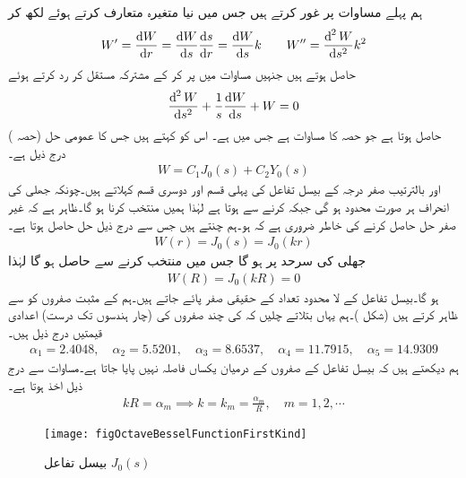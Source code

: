 \quad ہم پہلے مساوات  پر غور کرتے ہیں جس میں نیا متغیرہ  متعارف کرتے ہوئے
  لکھ کر
\begin{align*}
W'=\frac{\dif W}{\dif r}=\frac{\dif W}{\dif s}\frac{\dif s}{\dif r}=\frac{\dif W}{\dif s}k\quad \text{}\quad W''=\frac{\dif^{\,2}W}{\dif s^2}k^2
\end{align*}
حاصل ہوتے ہیں جنہیں مساوات  میں پر کر کے مشترکہ مستقل  کر رد کرتے ہوئے
\begin{align}
\frac{\dif^{\,2}W}{\dif s^2}+\frac{1}{s}\frac{\dif W}{\dif s}+W=0
\end{align}
حاصل ہوتا ہے جو حصہ  کا مساوات  ہے جس  میں  ہے۔ اس کو   کہتے ہیں جس کا عمومی حل (حصہ ) درج ذیل ہے۔
\begin{align*}
W=C_1J_0(s)+C_2Y_0(s)
\end{align*}
 اور  بالترتیب صفر درجہ کے بیسل تفاعل کی پہلی قسم اور دوسری قسم کہلاتے ہیں۔چونکہ جھلی کی انحراف ہر صورت محدود ہو گی جبکہ  کرنے سے  ہوتا ہے لہٰذا ہمیں  منتخب کرنا ہو گا۔ظاہر ہے کہ غیر صفر حل حاصل کرنے  کی خاطر ضروری ہے کہ  ہو۔ہم  چنتے ہیں جس سے درج ذیل حل حاصل ہوتا ہے۔
\begin{align}\label{مساوات_جزوی_دائری_حل_الف}
W(r)=J_0(s)=J_0(kr)
\end{align}
جھلی کی سرحد  پر  ہو گا جس میں  منتخب کرنے سے   حاصل ہو گا لہٰذا 
\begin{align*}
W(R)=J_0(kR)=0
\end{align*}
ہو گا۔بیسل تفاعل  کے لا محدود تعداد کے حقیقی صفر پائے جاتے ہیں۔ہم  کے مثبت صفروں کو  سے ظاہر کرتے ہیں (شکل )۔ہم یہاں بتلاتے چلیں کہ  کی چند صفروں کی (چار ہندسوں تک درست) اعدادی قیمتیں درج ذیل ہیں۔
\begin{align*}
\alpha_1=2.4048,\quad \alpha_2=5.5201,\quad \alpha_3=8.6537,\quad \alpha_4=11.7915,\quad \alpha_5=14.9309
\end{align*}
ہم دیکھتے ہیں کہ بیسل تفاعل کے صفروں کے درمیان یکساں فاصلہ نہیں پایا جاتا ہے۔مساوات  سے درج ذیل اخذ ہوتا ہے۔
\begin{align}\label{مساوات_جزوی_دائری_حل_ب}
kR=\alpha_m \implies k=k_m=\frac{\alpha_m}{R}, \quad m=1,2,\cdots
\end{align}
%
\begin{figure}
\centering
\texttt{[image: figOctaveBesselFunctionFirstKind]}
\caption{بیسل تفاعل $J_0(s)$}
\label{شکل_جزوی_بیسل_تفاعل_پہلی_قسم}
\end{figure}

